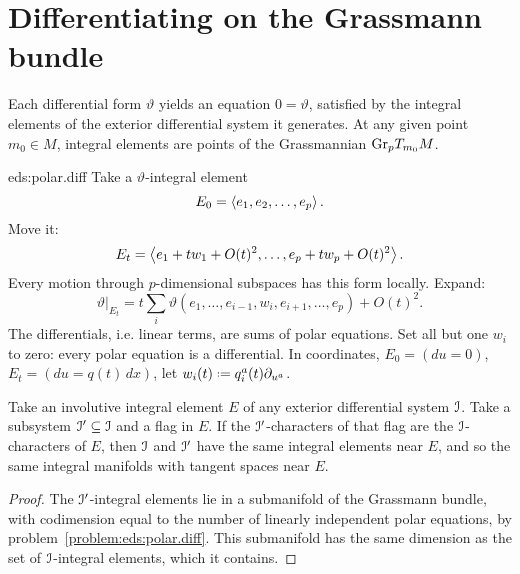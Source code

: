 \section{Differentiating on the Grassmann bundle}
Each differential form \(\vartheta\) yields an equation \(0=\vartheta\), satisfied by the integral elements of the exterior differential system it generates.
At any given point \(m_0 \in M\), integral elements are points of the Grassmannian \(\operatorname{Gr}_{p}\!T_{m_0} M\).
\begin{answer}{eds:polar.diff}
Take a \(\vartheta\)-integral element 
\[
E_0=\left<e_1,e_2,\dots,e_p\right>.
\]
Move it:
\[
E_t=\left<e_1+tw_1+O(t)^2,\dots,e_p+tw_p+O(t)^2\right>.
\]
Every motion through \(p\)-dimensional subspaces has this form locally.
Expand:
\[
\left.\vartheta\right|_{E_t}=t\sum_i \vartheta(e_1,\dots,e_{i-1},w_i,e_{i+1},\dots,e_p)+O(t)^2.
\]
The differentials, i.e. linear terms, are sums of polar equations.
Set all but one \(w_i\) to zero: every polar equation is a differential.
In coordinates, \(E_0=(du=0)\), \(E_t=(du=q(t) \, dx)\), let \(w_i(t)\defeq q^a_i(t)\p{u^a}\).
\end{answer}
\begin{corollary}\label{corollary:same.int.elts}
Take an involutive integral element \(E\) of any exterior differential system \(\mathcal{I}\).
Take a subsystem \(\mathcal{I}'\subseteq\mathcal{I}\) and a flag in \(E\).
If the \(\mathcal{I}'\)-characters of that flag are the \(\mathcal{I}\)-characters of \(E\), then \(\mathcal{I}\) and \(\mathcal{I}'\) have the same integral elements near \(E\), and so the same integral manifolds with tangent spaces near \(E\).
\end{corollary}
\begin{proof}
The \(\mathcal{I}'\)-integral elements lie in a submanifold of the Grassmann bundle, with codimension equal to the number of linearly independent polar equations, by problem~\vref{problem:eds:polar.diff}.
This submanifold has the same dimension as the set of \(\mathcal{I}\)-integral elements, which it contains.
\end{proof}

